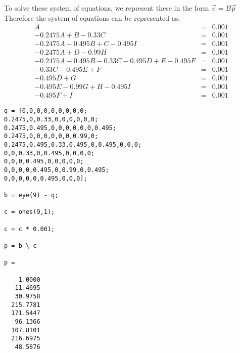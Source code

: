 \documentclass{article}
\begin{document}
To solve these system of equations, we represent these in the form $\vec{c} = B\vec{p}$
Therefore the system of equations can be represented as:
\[
\begin{array}{rcl}A & = & 0.001 \\ -0.2475A + B - 0.33C & = & 0.001 \\ -0.2475A - 0.495B + C - 0.495I & = & 0.001 \\ -0.2475A + D - 0.99H & = & 0.001 \\ -0.2475A - 0.495B - 0.33C -0.495D + E - 0.495F & = &0.001 \\ -0.33C - 0.495E + F & = & 0.001 \\ -0.495D + G & = & 0.001 \\ -0.495E - 0.99G + H - 0.495I & = & 0.001 \\ -0.495F + I & = & 0.001
\end{array}
\]
\begin{lstlisting}
q = [0,0,0,0,0,0,0,0,0;
0.2475,0,0.33,0,0,0,0,0,0;
0.2475,0.495,0,0,0,0,0,0,0.495;
0.2475,0,0,0,0,0,0,0.99,0;
0.2475,0.495,0.33,0.495,0,0.495,0,0,0;
0,0,0.33,0,0.495,0,0,0,0;
0,0,0,0.495,0,0,0,0,0;
0,0,0,0,0.495,0,0.99,0,0.495;
0,0,0,0,0,0.495,0,0,0];

b = eye(9) - q;

c = ones(9,1);

c = c * 0.001;

p = b \ c

p =

    1.0000
   11.4695
   30.9758
  215.7781
  171.5447
   96.1366
  107.8101
  216.6975
   48.5876
\end{lstlisting}
\end{document}
